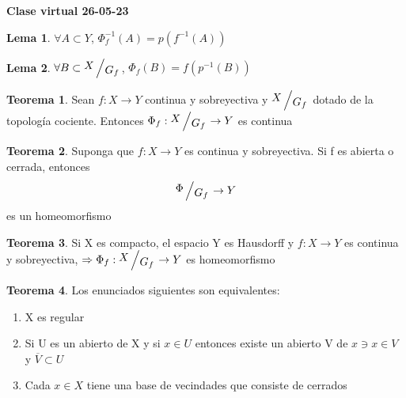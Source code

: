 \documentclass{article}
\theoremstyle{definition}
\newtheorem{theorem}{Teorema}[section]
\newtheorem{lemma}{Lema}[section]
\newcommand{\bigslant}[2]{{\raisebox{.2em}{$#1$}\left/\raisebox{-.2em}{$#2$}\right.}}
\begin{document}
\textbf{Clase virtual 26-05-23}
\begin{lemma}
	$\forall A\subset Y$, $\Phi_f^{-1}(A)=p(f^{-1}(A))$
\end{lemma}
\begin{lemma}
	$\forall B\subset \bigslant{X}{G_f}$, $\Phi_f(B)=f(p^{-1}(B))$
\end{lemma}
\begin{theorem}
	Sean $f:X\to Y$ continua y sobreyectiva y  $\bigslant{X}{G_f}$ dotado de la topología cociente. Entonces $\Phi_f:\bigslant{X}{G_f}\to Y$ es continua
\end{theorem}
\begin{theorem}
	Suponga que $f:X\to Y$ es continua y sobreyectiva. Si f es abierta o cerrada, entonces 
	\[ \bigslant{\Phi}{G_f}\to Y\]
	es un homeomorfismo
\end{theorem}
\begin{theorem}
	Si X es compacto, el espacio Y es Hausdorff y $f:X\to Y$ es continua y sobreyectiva, $\Rightarrow \Phi_f:\bigslant{X}{G_f}\to Y$ es homeomorfismo
\end{theorem}
\begin{theorem}
	Los enunciados siguientes son equivalentes:
	\begin{enumerate}
		\item X es regular
		\item Si U es un abierto de X y si $x\in U$ entonces existe un abierto V de $x\ni x\in V$ y $\overline{V}\subset U$
		\item Cada $x\in X$ tiene una base de vecindades que consiste de cerrados
	\end{enumerate}
\end{theorem}
\end{document}
